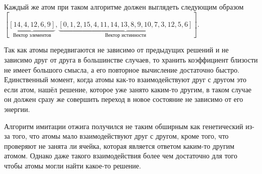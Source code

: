 \documentclass[14pt]{extarticle} %
\begin{document}
Каждый же атом при таком алгоритме должен выглядеть следующим образом 
$[\underbrace{[14, 4, 12, 6, 9]}_\text{Вектор элементов}, \underbrace{[0, 1, 2, 15, 4, 11, 14, 13, 8, 9, 10, 7, 3, 12, 5, 6] }_\text{Вектор истинности}]$.\par
Так как атомы передвигаются не зависимо от предыдущих решений и не зависимо друг от друга в большинстве случаев, то хранить коэффициент близости не имеет большого смысла, а его повторное вычисление достаточно быстро. Единственный момент, когда атомы как-то взаимодействуют друг с другом это если атом, нашёл решение, которое уже занято каким-то другим, в таком случае он должен сразу же совершить переход в новое состояние не зависимо от его энергии.





Алгоритм имитации отжига получился не таким обширным как генетический из-за того, что атомы мало взаимодействуют друг с другом, кроме того, что проверяют не занята ли ячейка, которая является ответом каким-то другим атомом. Однако даже такого взаимодействия более чем достаточно для того чтобы атомы могли найти какое-то решение.
\end{document}
